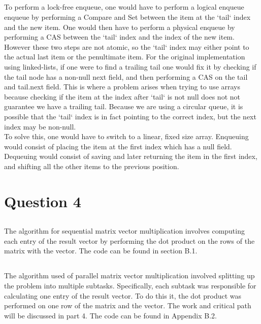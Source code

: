\documentclass[11pt]{article}
\begin{document}
\subsection{}
To perform a lock-free enqueue, one would have to perform a logical enqueue enqueue by performing a Compare and Set between the item at 
the `tail` index and the new item. One would then have to perform a physical enqueue by performing a CAS between the `tail` index and the 
index of the new item. However these two steps are not atomic, so the `tail` index may either point to the actual last item or the 
penultimate item. For the original implementation using linked-lists, if one were to find a trailing tail one would fix it by checking if 
the tail node has a non-null next field, and then performing a CAS on the tail and tail.next field. This is where a problem arises when 
trying to use arrays because checking if the item at the index after `tail` is not null does not not guarantee we have a  trailing tail. 
Because we are using a circular queue, it is possible that the `tail` index is in fact pointing to the correct index, but the next index 
may be non-null.\\
To solve this, one would have to switch to a linear, fixed size array. Enqueuing would consist of placing the item at the first index 
which has a null field. Dequeuing would consist of saving and later returning the item in the first index, and shifting all the other 
items to the previous position.

\section{Question 4}

\subsection{}
The algorithm for sequential matrix vector multiplication involves computing each entry of the result vector by performing the dot 
product on the rows of the matrix with the vector. The code can be found in section B.1.

\subsection{}
The algorithm used of parallel matrix vector multiplication involved splitting up the problem into multiple subtasks. Specifically, each 
subtask was responsible for calculating one entry of the result vector. To do this it, the dot product was performed on one row of the 
matrix and the vector. The work and critical path will be discussed in part 4. The code can be found in Appendix B.2.
\end{document}
